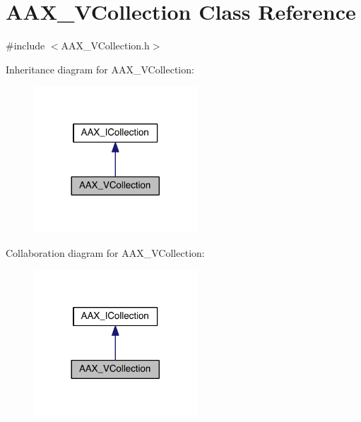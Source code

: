\hypertarget{a00130}{}\section{A\+A\+X\+\_\+\+V\+Collection Class Reference}
\label{a00130}


{\ttfamily \#include $<$A\+A\+X\+\_\+\+V\+Collection.\+h$>$}



Inheritance diagram for A\+A\+X\+\_\+\+V\+Collection\+:
\nopagebreak
\begin{figure}[H]
\begin{center}
\leavevmode
\includegraphics[width=173pt]{a00686}
\end{center}
\end{figure}


Collaboration diagram for A\+A\+X\+\_\+\+V\+Collection\+:
\nopagebreak
\begin{figure}[H]
\begin{center}
\leavevmode
\includegraphics[width=173pt]{a00687}
\end{center}
\end{figure}


